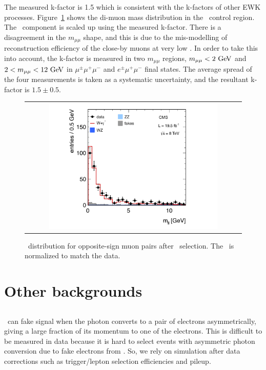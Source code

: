 The measured k-factor is 1.5 which is consistent with the k-factors of other EWK processes. 
Figure~\ref{fig:wg3l} shows the di-muon mass distribution in the \wgammastar\ control region.
The \wgammastar\ component is scaled up using the measured k-factor. 
There is a disagreement in the $m_{\mu\mu}$ shape, and this is due to the mis-modelling 
of reconstruction efficiency of the close-by muons at very low \pt. 
In order to take this into account, the k-factor is measured in two $m_{\mu\mu}$ regions, 
$m_{\mu\mu}<2~\mathrm{Ge\kern -0.1em V}$ and $2<m_{\mu\mu}<12~\mathrm{Ge\kern -0.1em V}$ in  $\mu^\pm\mu^+\mu^-$ and $e^\pm\mu^+\mu^-$ 
final states. The average spread of the four measurements is taken as a systematic uncertainty,
and the resultant k-factor is $1.5 \pm 0.5$.

\begin{figure}[htp] 
\centering 
\begin{tabular}{c} 
\includegraphics[width=0.8\textwidth]{figures/Wg3l.pdf} 
\end{tabular} 
\caption{\mll\ distribution for opposite-sign muon pairs after \wgammastar\ selection. 
The \wgammastar\ is normalized to match the data.} 
\label{fig:wg3l} 
\end{figure} 

\section{ Other backgrounds } 

\subsection{\wgamma}

\wgamma\ can fake signal when the photon converts to a pair of electrons asymmetrically, 
giving a large fraction of its momentum to one of the electrons. 
This is difficult to be measured in data because it is hard to select 
events with asymmetric photon conversion due to fake electrons from \Wjets. 
So, we rely on simulation after data corrections such as trigger/lepton 
selection efficiencies and pileup.

